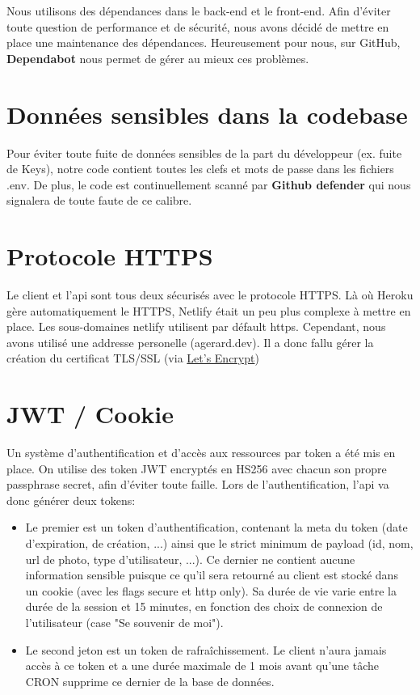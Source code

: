 Nous utilisons des dépendances dans le back-end et le front-end. Afin d'éviter toute question de performance et de sécurité, nous avons décidé de mettre en place une maintenance des dépendances. Heureusement pour nous, sur GitHub, \textbf{Dependabot} nous permet de gérer au mieux ces problèmes.

\section{Données sensibles dans la codebase}

Pour éviter toute fuite de données sensibles de la part du développeur (ex. fuite de Keys), notre code contient toutes les clefs et mots de passe dans les fichiers .env. De plus, le code est continuellement scanné par \textbf{Github defender} qui nous signalera de toute faute de ce calibre.

\section{Protocole HTTPS}
\label{HTTPS}

Le client et l'api sont tous deux sécurisés avec le protocole HTTPS. Là où Heroku gère automatiquement le HTTPS, Netlify était un peu plus complexe à mettre en place. Les sous-domaines netlify utilisent par défault https. Cependant, nous avons utilisé une addresse personelle (agerard.dev). Il a donc fallu gérer la création du certificat TLS/SSL (via \href{https://letsencrypt.org/}{Let's Encrypt})

\section{JWT / Cookie}

Un système d'authentification et d'accès aux ressources par token a été mis en place. On utilise des token JWT encryptés en HS256 avec chacun son propre passphrase secret, afin d'éviter toute faille. Lors de l'authentification, l'api va donc générer deux tokens:

\begin{itemize}
  \item Le premier est un token d'authentification, contenant la meta du token (date d'expiration, de création, ...) ainsi que le strict minimum de payload (id, nom, url de photo, type d'utilisateur, ...). Ce dernier ne contient aucune information sensible puisque ce qu'il sera retourné au client est stocké dans un cookie (avec les flags secure et http only). Sa durée de vie varie entre la durée de la session et 15 minutes, en fonction des choix de connexion de l'utilisateur (case "Se souvenir de moi").
  \item Le second jeton est un token de rafraîchissement. Le client n'aura jamais accès à ce token et a une durée maximale de 1 mois avant qu'une tâche CRON supprime ce dernier de la base de données.
\end{itemize}

